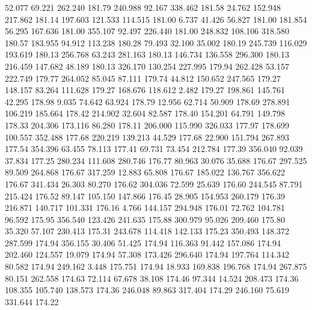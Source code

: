   52.077   69.221  262.240       181.79
 240.988   92.167  338.462       181.58
  24.762  152.948  217.862       181.14
 197.603  121.533  114.515       181.00
   6.737   41.426   56.827       181.00
 181.854   56.295  167.636       181.00
 355.107   92.497  226.440       181.00
 248.832  108.106  318.580       180.57
 183.955   94.912  113.238       180.28
  79.493   32.100   35.002       180.19
 245.739  116.029  193.619       180.13
 256.768   63.243  281.163       180.13
 146.734  136.558  296.300       180.13
 216.459  147.682   48.189       180.13
 326.170  130.254  227.995       179.94
 262.428   53.157  222.749       179.77
 264.052   85.045   87.111       179.74
  44.812  150.652  247.565       179.27
 148.157   83.264  111.628       179.27
 168.676  118.612    2.482       179.27
 198.861  145.761   42.295       178.98
   9.035   74.642   63.924       178.79
  12.956   62.714   50.909       178.69
 278.891  106.219  185.664       178.42
 214.902   32.604   82.587       178.40
 154.201   64.791  149.798       178.33
 204.306  173.116   86.280       178.11
 206.000  115.990  326.033       177.97
 178.699  100.557  352.488       177.68
 220.219  139.213   44.529       177.68
  22.900  151.794  267.893       177.54
 354.396   63.455   78.113       177.41
  69.731   73.454  212.784       177.39
 356.040   92.039   37.834       177.25
 280.234  111.608  280.746       176.77
  80.963   30.076   35.688       176.67
 297.525   89.509  264.868       176.67
 317.259   12.883   65.808       176.67
 185.022  136.767  356.622       176.67
 341.434   26.303   80.270       176.62
 304.036   72.599   25.639       176.60
 244.545   87.791  215.424       176.52
  89.147  105.150  147.866       176.45
  28.905  154.953  260.179       176.39
 216.871  140.717  101.331       176.16
   4.766  144.157  294.948       176.01
  72.762  104.781   96.592       175.95
 356.540  123.426  241.635       175.88
 300.979   95.026  209.460       175.80
  35.320   57.107  230.413       175.31
 243.678  114.418  142.133       175.23
 350.493  148.372  287.599       174.94
 356.155   30.406   51.425       174.94
 116.363   91.442  157.086       174.94
 202.460  124.557   19.079       174.94
  57.308  173.426  296.640       174.94
 197.764  114.342   80.582       174.94
 249.162    3.448  175.751       174.94
  18.933  169.838  196.768       174.94
 267.875   80.151  262.558       174.63
  72.114   67.678   38.108       174.46
  97.344   14.524  208.473       174.36
 108.355  105.740  138.573       174.36
 246.048   89.863  317.404       174.29
 246.160   75.619  331.644       174.22
